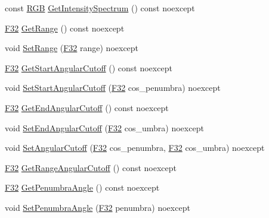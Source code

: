 \begin{DoxyCompactItemize}
\item 
const \hyperlink{structmage_1_1_r_g_b}{R\+GB} \hyperlink{classmage_1_1_spot_light_ad05d3abab9285f8c25ac42ee446d6e05}{Get\+Intensity\+Spectrum} () const noexcept
\item 
\hyperlink{namespacemage_aa97e833b45f06d60a0a9c4fc22ae02c0}{F32} \hyperlink{classmage_1_1_spot_light_a19baba95ca8c5f5f6147ab0a03e6b64a}{Get\+Range} () const noexcept
\item 
void \hyperlink{classmage_1_1_spot_light_a96f8d35fe374f9d06c49d68a3ac1f213}{Set\+Range} (\hyperlink{namespacemage_aa97e833b45f06d60a0a9c4fc22ae02c0}{F32} range) noexcept
\item 
\hyperlink{namespacemage_aa97e833b45f06d60a0a9c4fc22ae02c0}{F32} \hyperlink{classmage_1_1_spot_light_a649e84aaf1f98c605f14d9597241df72}{Get\+Start\+Angular\+Cutoff} () const noexcept
\item 
void \hyperlink{classmage_1_1_spot_light_afae0adbfe0da1a897696a90294c93aef}{Set\+Start\+Angular\+Cutoff} (\hyperlink{namespacemage_aa97e833b45f06d60a0a9c4fc22ae02c0}{F32} cos\+\_\+penumbra) noexcept
\item 
\hyperlink{namespacemage_aa97e833b45f06d60a0a9c4fc22ae02c0}{F32} \hyperlink{classmage_1_1_spot_light_ad9c4cabf950619605a8040e41b9acb5b}{Get\+End\+Angular\+Cutoff} () const noexcept
\item 
void \hyperlink{classmage_1_1_spot_light_a2c200dc6f60a0c9a072680a9c5ee12d5}{Set\+End\+Angular\+Cutoff} (\hyperlink{namespacemage_aa97e833b45f06d60a0a9c4fc22ae02c0}{F32} cos\+\_\+umbra) noexcept
\item 
void \hyperlink{classmage_1_1_spot_light_aff7fad222e3c8e41d6fbeeea7f3a0893}{Set\+Angular\+Cutoff} (\hyperlink{namespacemage_aa97e833b45f06d60a0a9c4fc22ae02c0}{F32} cos\+\_\+penumbra, \hyperlink{namespacemage_aa97e833b45f06d60a0a9c4fc22ae02c0}{F32} cos\+\_\+umbra) noexcept
\item 
\hyperlink{namespacemage_aa97e833b45f06d60a0a9c4fc22ae02c0}{F32} \hyperlink{classmage_1_1_spot_light_ada7b32eb18cc2bb6707a62c4ab72f4f2}{Get\+Range\+Angular\+Cutoff} () const noexcept
\item 
\hyperlink{namespacemage_aa97e833b45f06d60a0a9c4fc22ae02c0}{F32} \hyperlink{classmage_1_1_spot_light_a37d61501193f5ed4ecefe4015595ed89}{Get\+Penumbra\+Angle} () const noexcept
\item 
void \hyperlink{classmage_1_1_spot_light_a7de9894d815f8ac69cbfefc8656e8f8f}{Set\+Penumbra\+Angle} (\hyperlink{namespacemage_aa97e833b45f06d60a0a9c4fc22ae02c0}{F32} penumbra) noexcept
\item 

\end{DoxyCompactItemize}
